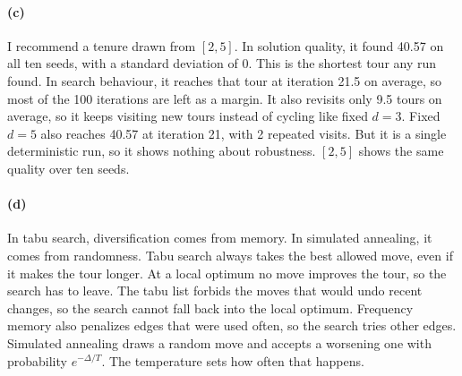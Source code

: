 \documentclass[11pt]{article}
\begin{document}
\paragraph{(c)}
I recommend a tenure drawn from $[2, 5]$. In solution quality, it found 40.57 on all ten seeds, with a standard deviation of 0. This is the shortest tour any run found. In search behaviour, it reaches that tour at iteration 21.5 on average, so most of the 100 iterations are left as a margin. It also revisits only 9.5 tours on average, so it keeps visiting new tours instead of cycling like fixed $d = 3$. Fixed $d = 5$ also reaches 40.57 at iteration 21, with 2 repeated visits. But it is a single deterministic run, so it shows nothing about robustness. $[2, 5]$ shows the same quality over ten seeds.

\paragraph{(d)}
In tabu search, diversification comes from memory. In simulated annealing, it comes from randomness. Tabu search always takes the best allowed move, even if it makes the tour longer. At a local optimum no move improves the tour, so the search has to leave. The tabu list forbids the moves that would undo recent changes, so the search cannot fall back into the local optimum. Frequency memory also penalizes edges that were used often, so the search tries other edges. Simulated annealing draws a random move and accepts a worsening one with probability $e^{-\Delta / T}$. The temperature sets how often that happens.
\end{document}
